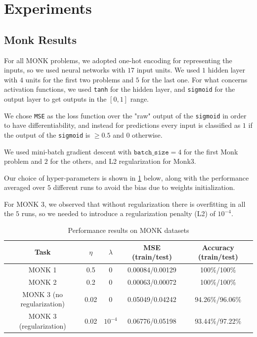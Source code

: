 \section{Experiments}

\subsection{Monk Results}

For all MONK problems, we adopted one-hot encoding for representing the inputs, so we used neural networks with $17$ input units. We used $1$ hidden layer with $4$ units for the first two problems and $5$ for the last one. For what concerns activation functions, we used \texttt{tanh} for the hidden layer, and \texttt{sigmoid} for the output layer to get outputs in the $[0, 1]$ range.

We chose \texttt{MSE} as the loss function over the "raw" output of the \texttt{sigmoid} in order to have differentiability, and instead for predictions every input is classified as $1$ if the output of the \texttt{sigmoid} is $\ge 0.5$ and $0$ otherwise.

We used mini-batch gradient descent with $\texttt{batch\_size} = 4$ for the first Monk problem and $2$ for the others, and L2 regularization for Monk3.

Our choice of hyper-parameters is shown in \cref{fig:hyper} below, along with the performance averaged over $5$ different runs to avoid the bias due to weights initialization.

For MONK 3, we observed that without regularization there is overfitting in all the $5$ runs, so we needed to introduce a regularization penalty (L2) of $10^{-4}$.

\begin{table}[htb]
    \centering
    \begin{tabular}{|c|c|c|c|c|}
        \hline 
        Task & $\eta$ & $\lambda$ & MSE (train/test) & Accuracy (train/test) \\ \hline
        MONK 1 & 0.5 & 0 & 0.00084/0.00129  & 100\%/100\% \\ \hline
        MONK 2 & 0.2 & 0 & 0.00063/0.00072 & 100\%/100\% \\ \hline
        MONK 3 (no regularization) & 0.02 & 0 & 0.05049/0.04242 & 94.26\%/96.06\% \\ \hline
        MONK 3 (regularization) & 0.02 & $10^{-4}$ & 0.06776/0.05198 & 93.44\%/97.22\% \\ \hline
    \end{tabular}
    \caption{Performance results on MONK datasets}
    \label{fig:hyper}
\end{table}

